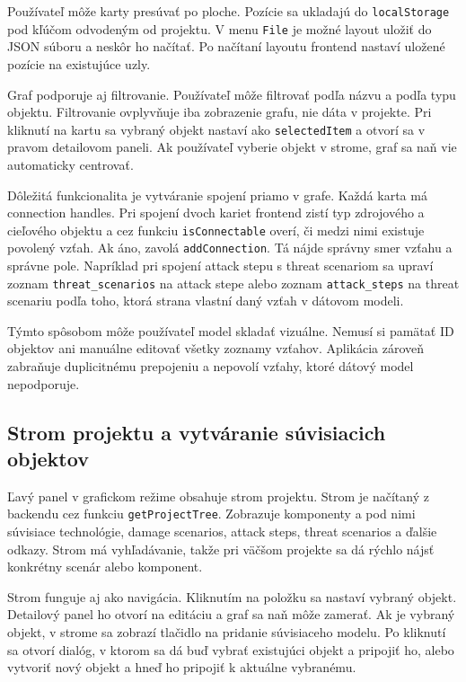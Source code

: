 \documentclass[11pt]{article}
\begin{document}
Používateľ môže karty presúvať po ploche. Pozície sa ukladajú do \texttt{localStorage} pod kľúčom odvodeným od projektu. V menu \texttt{File} je možné layout uložiť do JSON súboru a neskôr ho načítať. Po načítaní layoutu frontend nastaví uložené pozície na existujúce uzly.

Graf podporuje aj filtrovanie. Používateľ môže filtrovať podľa názvu a podľa typu objektu. Filtrovanie ovplyvňuje iba zobrazenie grafu, nie dáta v projekte. Pri kliknutí na kartu sa vybraný objekt nastaví ako \texttt{selectedItem} a otvorí sa v pravom detailovom paneli. Ak používateľ vyberie objekt v strome, graf sa naň vie automaticky centrovať.

Dôležitá funkcionalita je vytváranie spojení priamo v grafe. Každá karta má connection handles. Pri spojení dvoch kariet frontend zistí typ zdrojového a cieľového objektu a cez funkciu \texttt{isConnectable} overí, či medzi nimi existuje povolený vzťah. Ak áno, zavolá \texttt{addConnection}. Tá nájde správny smer vzťahu a správne pole. Napríklad pri spojení attack stepu s threat scenariom sa upraví zoznam \texttt{threat\_scenarios} na attack stepe alebo zoznam \texttt{attack\_steps} na threat scenariu podľa toho, ktorá strana vlastní daný vzťah v dátovom modeli.

Týmto spôsobom môže používateľ model skladať vizuálne. Nemusí si pamätať ID objektov ani manuálne editovať všetky zoznamy vzťahov. Aplikácia zároveň zabraňuje duplicitnému prepojeniu a nepovolí vzťahy, ktoré dátový model nepodporuje.

\subsection{Strom projektu a vytváranie súvisiacich objektov}

Ľavý panel v grafickom režime obsahuje strom projektu. Strom je načítaný z backendu cez funkciu \texttt{getProjectTree}. Zobrazuje komponenty a pod nimi súvisiace technológie, damage scenarios, attack steps, threat scenarios a ďalšie odkazy. Strom má vyhľadávanie, takže pri väčšom projekte sa dá rýchlo nájsť konkrétny scenár alebo komponent.

Strom funguje aj ako navigácia. Kliknutím na položku sa nastaví vybraný objekt. Detailový panel ho otvorí na editáciu a graf sa naň môže zamerať. Ak je vybraný objekt, v strome sa zobrazí tlačidlo na pridanie súvisiaceho modelu. Po kliknutí sa otvorí dialóg, v ktorom sa dá buď vybrať existujúci objekt a pripojiť ho, alebo vytvoriť nový objekt a hneď ho pripojiť k aktuálne vybranému.
\end{document}
